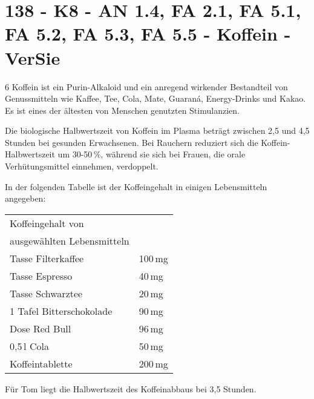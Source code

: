 \section{138 - K8 - AN 1.4, FA 2.1, FA 5.1, FA 5.2, FA 5.3, FA 5.5 - Koffein - VerSie}

\begin{langesbeispiel} \item[6] %
Koffein ist ein Purin-Alkaloid und ein anregend wirkender Bestandteil von Genussmitteln wie Kaffee, Tee, Cola, Mate, Guaraná, Energy-Drinks und Kakao. Es ist eines der ältesten von Menschen genutzten Stimulanzien. 

Die biologische Halbwertszeit von Koffein im Plasma beträgt zwischen 2,5 und 4,5 Stunden  bei gesunden Erwachsenen. Bei Rauchern reduziert sich die Koffein-Halbwertszeit um 30-50\,\%, während sie sich bei Frauen, die orale Verhütungsmittel einnehmen, verdoppelt.

In der folgenden Tabelle ist der Koffeingehalt in einigen Lebensmitteln angegeben:
\begin{center}
\begin{tabular}{|l|l|}\hline
Koffeingehalt von&\\
ausgewählten Lebensmitteln&\\ \hline
Tasse Filterkaffee&100\,mg\\ \hline
Tasse Espresso&40\,mg\\ \hline
Tasse Schwarztee&20\,mg\\ \hline
1 Tafel Bitterschokolade&90\,mg\\ \hline
Dose Red Bull&96\,mg\\ \hline
0,5\,l Cola&50\,mg\\ \hline
Koffeintablette&200\,mg\\ \hline
\end{tabular}
\end{center}%

\begin{aufgabenstellung}
\item Für Tom liegt die Halbwertszeit des Koffeinabbaus bei 3,5 Stunden.%



\end{aufgabenstellung}
\end{langesbeispiel}
